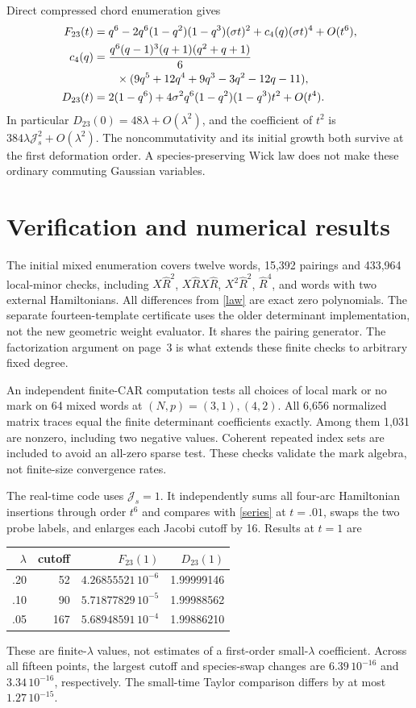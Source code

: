 \documentclass[11pt,a4paper]{article}
\newcommand{\Js}{\mathcal J_s}
\newcommand{\Rh}{\widehat R}
\newcommand{\sig}{\sigma}
\begin{document}
Direct compressed chord enumeration gives
\begin{align}
 F_{23}(t)&=q^6-2q^6(1-q^2)(1-q^3)(\sig t)^2
                +c_4(q)(\sig t)^4+O(t^6),\\
 c_4(q)&=\frac{q^6(q-1)^3(q+1)(q^2+q+1)}6\notag\\
 &\qquad\times(9q^5+12q^4+9q^3-3q^2-12q-11),\\
 D_{23}(t)&=2(1-q^6)+4\sig^2q^6(1-q^2)(1-q^3)t^2+O(t^4).
\end{align}
In particular $D_{23}(0)=48\lambda+O(\lambda^2)$, and the coefficient
of $t^2$ is $384\lambda\Js^2+O(\lambda^2)$. The noncommutativity and its
initial growth both survive at the first deformation order. A
species-preserving Wick law does not make these ordinary commuting
Gaussian variables.

\newpage
\section{Verification and numerical results}
The initial mixed enumeration covers twelve words, 15,392 pairings and
433,964 local-minor checks, including
$X\Rh^2$, $X\Rh X\Rh$, $X^2\Rh^2$, $\Rh^4$, and words with two external
Hamiltonians. All differences from \eqref{law} are exact zero polynomials.
The separate fourteen-template certificate uses the older determinant
implementation, not the new geometric weight evaluator. It shares the
pairing generator. The factorization argument on page~3 is what extends
these finite checks to arbitrary fixed degree.

An independent finite-CAR computation tests all choices of local mark
or no mark on 64 mixed words at $(N,p)=(3,1),(4,2)$. All 6,656 normalized
matrix traces equal the finite determinant coefficients exactly. Among
them 1,031 are nonzero, including two negative values. Coherent repeated
index sets are included to avoid an all-zero sparse test. These checks
validate the mark algebra, not finite-size convergence rates.

The real-time code uses $\Js=1$. It independently sums all four-arc
Hamiltonian insertions through order $t^6$ and compares with
\eqref{series} at $t=.01$, swaps the two probe labels, and enlarges each
Jacobi cutoff by 16. Results at $t=1$ are
\begin{center}
\begin{tabular}{rrrr}
\toprule
$\lambda$&cutoff&$F_{23}(1)$&$D_{23}(1)$\\\midrule
.20&52&$4.26855521\,10^{-6}$&1.99999146\\
.10&90&$5.71877829\,10^{-5}$&1.99988562\\
.05&167&$5.68948591\,10^{-4}$&1.99886210\\\bottomrule
\end{tabular}
\end{center}
These are finite-$\lambda$ values, not estimates of a first-order
small-$\lambda$ coefficient.
Across all fifteen points, the largest cutoff and species-swap changes
are $6.39\,10^{-16}$ and $3.34\,10^{-16}$, respectively. The small-time
Taylor comparison differs by at most $1.27\,10^{-15}$.
\end{document}
